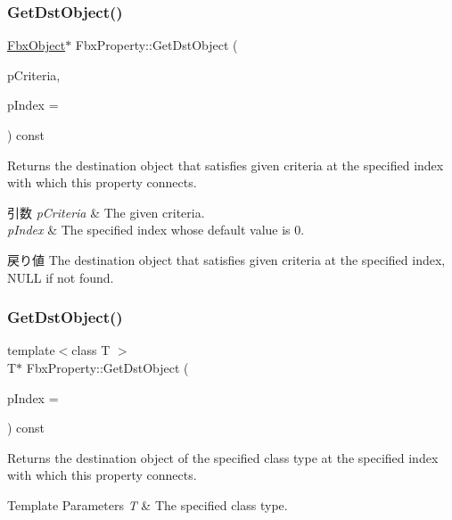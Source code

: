 \subsubsection{\texorpdfstring{Get\+Dst\+Object()}{GetDstObject()}\hspace{0.1cm}{\footnotesize\ttfamily [2/4]}}
{\footnotesize\ttfamily \hyperlink{class_fbx_object}{Fbx\+Object}$\ast$ Fbx\+Property\+::\+Get\+Dst\+Object (\begin{DoxyParamCaption}\item[{const \hyperlink{class_fbx_criteria}{Fbx\+Criteria} \&}]{p\+Criteria,  }\item[{const int}]{p\+Index = {} }\end{DoxyParamCaption}) const}

Returns the destination object that satisfies given criteria at the specified index with which this property connects. 
\begin{DoxyParams}{引数}
{\em p\+Criteria} & The given criteria. \\
\hline
{\em p\+Index} & The specified index whose default value is 0. \\
\hline
\end{DoxyParams}
\begin{DoxyReturn}{戻り値}
The destination object that satisfies given criteria at the specified index, N\+U\+LL if not found. 
\end{DoxyReturn}
\mbox{\label{class_fbx_property_a97b492c1eb439a481dbea8f494b82a2e}} 
\subsubsection{\texorpdfstring{Get\+Dst\+Object()}{GetDstObject()}\hspace{0.1cm}{\footnotesize\ttfamily [3/4]}}
{\footnotesize\ttfamily template$<$class T $>$ \\
T$\ast$ Fbx\+Property\+::\+Get\+Dst\+Object (\begin{DoxyParamCaption}\item[{const int}]{p\+Index = {} }\end{DoxyParamCaption}) const\hspace{0.3cm}{\ttfamily [inline]}}

Returns the destination object of the specified class type at the specified index with which this property connects. 
\begin{DoxyTemplParams}{Template Parameters}
{\em T} & The specified class type. \\
\hline
\end{DoxyTemplParams}

